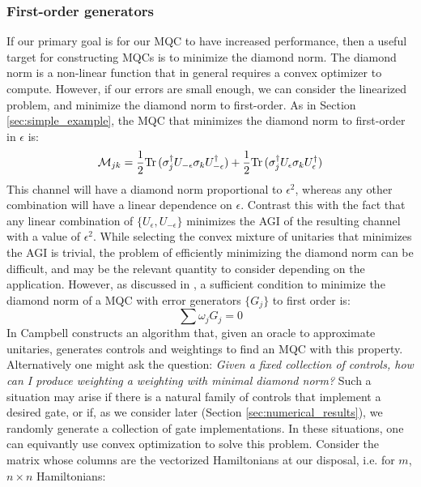 \documentclass[aps,nofootinbib,pra,notitlepage,twocolumn]{revtex4-1}
\newcommand{\tr}{{\rm Tr\thinspace}}
\begin{document}
\subsubsection{First-order generators} %
\label{sub:first_order_generators}
If our primary goal is for our MQC to have increased performance, then a useful target for constructing MQCs is to minimize the diamond norm. The diamond norm is a non-linear function that in general requires a convex optimizer to compute. However, if our errors are small enough, we can consider the linearized problem, and minimize the diamond norm to first-order. As in Section \ref{sec:simple_example}, the MQC that minimizes the diamond norm to first-order in $\epsilon$ is:
\begin{equation}\label{eq:balanced}
\mathcal{M}_{jk} = \frac{1}{2}\tr(\sigma_j^{\dagger}U_{-\epsilon}\sigma_kU_{-\epsilon}^{\dagger}) + \frac{1}{2}\tr(\sigma_j^{\dagger}U_{\epsilon}\sigma_kU_{\epsilon}^{\dagger})
\end{equation}
This channel will have a diamond norm proportional to $\epsilon^2$, whereas any other combination will have a linear dependence on $\epsilon$. Contrast this with the fact that any linear combination of $\{U_{\epsilon}, U_{-\epsilon}\}$ minimizes the AGI of the resulting channel with a value of $\epsilon^2$. While selecting the convex mixture of unitaries that minimizes the AGI is  trivial, the problem of efficiently minimizing the diamond norm can be difficult, and may be the relevant quantity to consider depending on the application. However, as discussed in \cite{Campbell2017}, a sufficient condition to minimize the diamond norm of a MQC with error generators $\{G_j\}$ to first order is:
\begin{equation}\label{eq:campbell-condition}
\sum \omega_j G_j = 0
\end{equation}
In \cite{Campbell2017} Campbell constructs an algorithm that, given an oracle to approximate unitaries, generates controls and weightings to find an MQC with this property. Alternatively one might ask the question: \textit{Given a fixed collection of controls, how can I produce weighting a weighting with minimal diamond norm?} Such a situation may arise if there is a natural family of controls that implement a desired gate, or if, as we consider later (Section \ref{sec:numerical_results}), we randomly generate a collection of gate implementations. In these situations, one can equivantly use convex optimization to solve this problem. Consider the matrix whose columns are the vectorized Hamiltonians at our disposal, i.e. for $m$, $n\times n$ Hamiltonians:
\end{document}
